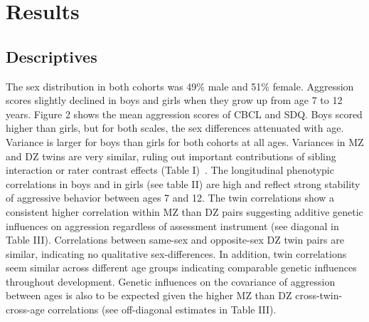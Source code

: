 ﻿\section{Results}
\subsection{Descriptives}
The sex distribution in both cohorts was 49\% male and 51\% female.
Aggression scores slightly declined in boys and girls when they grow up from age 7 to 12 years.
Figure 2 shows the mean aggression scores of CBCL and SDQ\@.
Boys scored higher than girls, but for both scales, the sex differences attenuated with age.
Variance is larger for boys than girls for both cohorts at all ages.
Variances in MZ and DZ twins are very similar, ruling out important contributions of sibling interaction or rater contrast effects (Table I)~\cite{Eaves1978, Boomsma2014}.
The longitudinal phenotypic correlations in boys and in girls (see table II) are high and reflect strong stability of aggressive behavior between ages 7 and 12.
The twin correlations show a consistent higher correlation within MZ than DZ pairs suggesting additive genetic influences on aggression regardless of assessment instrument (see diagonal in Table III).
Correlations between same-sex and opposite-sex DZ twin pairs are similar, indicating no qualitative sex-differences.
In addition, twin correlations seem similar across different age groups indicating comparable genetic influences throughout development.
Genetic influences on the covariance of aggression between ages is also to be expected given the higher MZ than DZ cross-twin-cross-age correlations (see off-diagonal estimates in Table III). 
